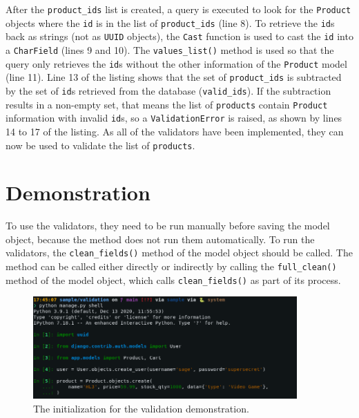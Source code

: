 After the \verb|product_ids| list is created, a query is executed to look for
the \verb|Product| objects where the \verb|id| is in the list of
\verb|product_ids| (line 8). To retrieve the \verb|id|s back as strings (not as
\verb|UUID| objects), the \verb|Cast| function is used to cast the \verb|id|
into a \verb|CharField| (lines 9 and 10). The \verb|values_list()| method is
used so that the query only retrieves the \verb|id|s without the other
information of the \verb|Product| model (line 11). Line 13 of the listing shows
that the set of \verb|product_ids| is subtracted by the set of \verb|id|s
retrieved from the database (\verb|valid_ids|). If the subtraction results in a
non-empty set, that means the list of \verb|products| contain \verb|Product|
information with invalid \verb|id|s, so a \verb|ValidationError| is raised, as
shown by lines 14 to 17 of the listing. As all of the validators have been
implemented, they can now be used to validate the list of \verb|products|.

\section{Demonstration}

To use the validators, they need to be run manually before saving the model
object, because the method does not run them automatically. To run the
validators, the \verb|clean_fields()| method of the model object should be
called. The method can be called either directly or indirectly by calling the
\verb|full_clean()| method of the model object, which calls
\verb|clean_fields()| as part of its process.

\begin{figure}
	\centering
    \includegraphics[width=0.90\textwidth]{pics/validation0.png}
	\caption{The initialization for the validation demonstration.}
	\label{fig:validation0}
\end{figure}

